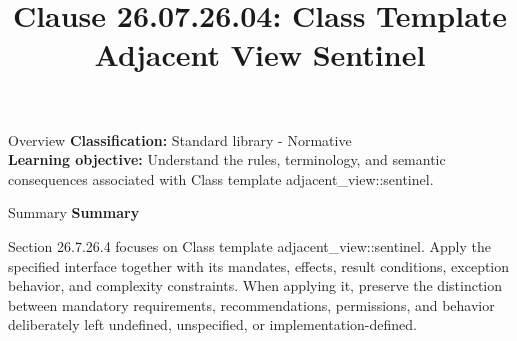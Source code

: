 \documentclass[10pt,letterpaper]{article}
\title{Clause 26.07.26.04: Class Template Adjacent View Sentinel}
\author{}
\date{}
\begin{document}
\maketitle
\begin{CornellOverviewBox}{Overview}
\textbf{Classification:} Standard library - Normative\\[2pt]
\textbf{Learning objective:} Understand the rules, terminology, and semantic consequences associated with Class template adjacent\_view::sentinel.
\end{CornellOverviewBox}\begin{CornellSummaryBox}{Summary}
{\sffamily\bfseries\color{Accent} Summary}\par\vspace{3pt}Section 26.7.26.4 focuses on Class template adjacent\_view::sentinel. Apply the specified interface together with its mandates, effects, result conditions, exception behavior, and complexity constraints. When applying it, preserve the distinction between mandatory requirements, recommendations, permissions, and behavior deliberately left undefined, unspecified, or implementation-defined.
\end{CornellSummaryBox}
\end{document}
